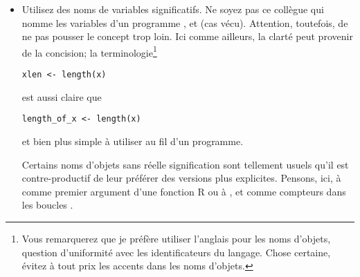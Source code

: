 \begin{itemize}
\item Utilisez des noms de variables significatifs. Ne soyez pas ce
  collègue qui nomme les variables d'un programme , 
  et  (cas vécu). Attention, toutefois, de ne pas pousser le
  concept trop loin. Ici comme ailleurs, la clarté peut provenir de la
  concision; la terminologie\footnote{%
    Vous remarquerez que je préfère utiliser l'anglais pour les
    noms d'objets, question d'uniformité avec les identificateurs du
    langage. Chose certaine, évitez à tout prix les accents dans les
    noms d'objets.}
  \begin{Schunk}
\begin{Verbatim}
xlen <- length(x)
\end{Verbatim}
  \end{Schunk}
  est aussi claire que
  \begin{Schunk}
\begin{Verbatim}
length_of_x <- length(x)
\end{Verbatim}
  \end{Schunk}
  et bien plus simple à utiliser au fil d'un programme.

  Certains noms d'objets sans réelle signification sont tellement
  usuels qu'il est contre-productif de leur préférer des versions plus
  explicites. Pensons, ici, à  comme premier argument d'une
  fonction R ou à ,  et  comme compteurs dans
  les boucles .


\end{itemize}
